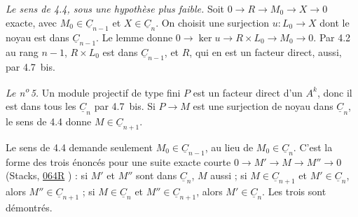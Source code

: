 \emph{Le sens  de 4.4, sous une hypothèse plus faible.} Soit $0 \to R \to M_0 \to X \to 0$ exacte, avec $M_0 \in \underline C_{n-1}$ et $X \in \underline C_n$. On choisit une surjection $u : L_0 \to X$ dont le noyau est dans $\underline C_{n-1}$. Le lemme donne $0 \to \ker u \to R \times L_0 \to M_0 \to 0$. Par 4.2 au rang $n - 1$, $R \times L_0$ est dans $\underline C_{n-1}$, et $R$, qui en est un facteur direct, aussi, par 4.7~bis.

\emph{Le n\textsuperscript{o}\,5.} Un module projectif de type fini $P$ est un facteur direct d'un $A^k$, donc il est dans tous les $\underline C_n$ par 4.7~bis. Si $P \to M$ est une surjection de noyau dans $\underline C_n$, le sens  de 4.4 donne $M \in \underline C_{n+1}$.

\begin{remarque}
Le sens  de 4.4 demande seulement $M_0 \in \underline C_{n-1}$, au lieu de $M_0 \in \underline C_n$. C'est la forme des trois énoncés  pour une suite exacte courte $0 \to M' \to M \to M'' \to 0$ (Stacks, \href{https://stacks.math.columbia.edu/tag/064R}{064R} \cite{stacks}) : si $M'$ et $M''$ sont dans $\underline C_n$, $M$ aussi ; si $M \in \underline C_{n+1}$ et $M' \in \underline C_n$, alors $M'' \in \underline C_{n+1}$ ; si $M \in \underline C_n$ et $M'' \in \underline C_{n+1}$, alors $M' \in \underline C_n$. Les trois sont démontrés.
\end{remarque}

